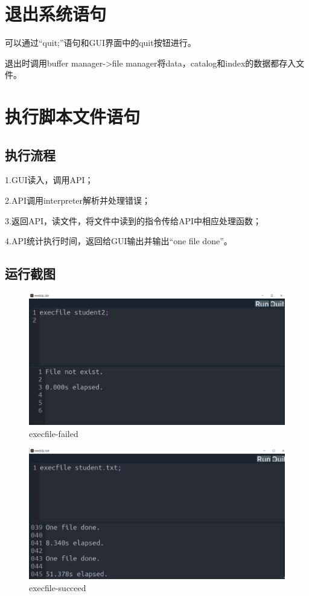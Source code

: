 \documentclass[UTF8]{ctexrep} %
\begin{document}
\section{退出系统语句}
可以通过“quit;”语句和GUI界面中的quit按钮进行。
\par
退出时调用buffer manager->file manager将data，catalog和index的数据都存入文件。
\section{执行脚本文件语句}
\subsection{执行流程}
1.GUI读入，调用API；
\par
2.API调用interpreter解析并处理错误；
\par
3.返回API，读文件，将文件中读到的指令传给API中相应处理函数；
\par
4.API统计执行时间，返回给GUI输出并输出“one file done”。
\subsection{运行截图}
\begin{figure}[H]
    \centering
    \includegraphics[width=0.8\linewidth]{figure/8.1.png}
    \caption{execfile-failed}
    \label{fig:runtime8.1}
\end{figure}
\begin{figure}[H]
    \centering
    \includegraphics[width=0.8\linewidth]{figure/8.2.png}
    \caption{execfile-succeed}
    \label{fig:runtime8.2}
\end{figure}
\end{document}
